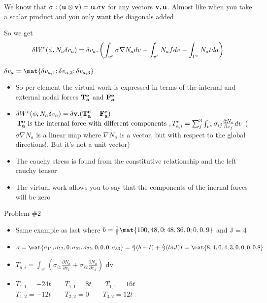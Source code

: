 	\begin{frame}
		We know that $\mathbf{\sigma :(u \otimes v) = u. \sigma v}$ for any vectors $\mathbf{v,u}$. Almost like when you take a scalar product and you only want the diagonals added
		
		So we get 
		\begin{equation}
			\delta W^e(\phi,N_a\delta v_a) =  \delta v_a .\left(\int_{v^e} \mathbf{\sigma} \nabla N_a dv - \int_{v^e} N_af dv - \int_{\Gamma^e} N_a tda \right)
		\end{equation}
		
		$\delta v_a = \mat{\delta v_{a,1} ; \delta v_{a,2}; \delta v_{a,3}}$\\
		
		\begin{itemize}
			\item So per element the virtual work is expressed in terms of the internal and external nodal forces $\mathbf{T_a^e}$ and $\mathbf{F_a^e}$
			\item $ \delta W^e(\phi,N_a\delta v_a) = \mathbf{\delta v.(T_a^e-F_a^e)}$ \\
			$\mathbf{T_a^e} ~\text{is the internal force with different components }, T_{a,i}^e = \sum_{j}^{3} \int_{v^e} \sigma_{ij}\frac{\partial N_a}{\partial x_j} dv$ ($\sigma \nabla N_a$ is a linear map where $\nabla N_a$ is a vector, but with respect to the global directions!. But it's not a unit vector)	
			\item The cauchy stress is found from the constitutive relationship and the left cauchy tensor	
			\item The virtual work allows you to say that the components of the inernal forces will be zero
		\end{itemize}
	\end{frame}


	\begin{frame}{Problem \#2}
		\begin{itemize}
			\item Same example as last where $b = \frac{1}{9} \mat{100,48,0;48,36,0;0,0,9}$ and J = 4
			\item $\sigma =  \mat{\sigma_{11},\sigma_{12},0;\sigma_{21},\sigma_{22},0;
			0,0,\sigma_{33}} = \frac{\mu}{J}(b-I) + \frac{\lambda}{J}(lnJ)I = \mat{8,4,0;4,3,0;0,0,0.8}$
			\item $T_{a,i} = \int_{v^e} \left(\sigma_{i1} \frac{\partial N_a}{\partial x_1} + \sigma_{i2} \frac{\partial N_a}{\partial x_2} \right)$ dv \\
			\item $ T_{1,1} = -24t \qquad T_{1,1} = 8t \qquad T_{1,1} = 16t $ \\ 
				  $	T_{1,2} = -12t \qquad T_{2,2} = 0 \qquad T_{3,2} = 12t $	 		
		\end{itemize}
 	\end{frame}
 
